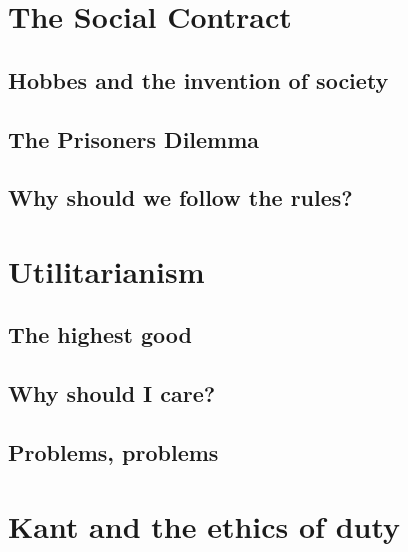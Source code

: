 \documentclass[justified]{tufte-book}
\begin{document}
\hypertarget{the-social-contract}{%
\chapter{The Social Contract}\label{the-social-contract}}

\hypertarget{hobbes-and-the-invention-of-society}{%
\section{Hobbes and the invention of society}\label{hobbes-and-the-invention-of-society}}

\hypertarget{the-prisoners-dilemma}{%
\section{The Prisoners Dilemma}\label{the-prisoners-dilemma}}

\hypertarget{why-should-we-follow-the-rules}{%
\section{Why should we follow the rules?}\label{why-should-we-follow-the-rules}}

\hypertarget{utilitarianism}{%
\chapter{Utilitarianism}\label{utilitarianism}}

\hypertarget{the-highest-good}{%
\section{The highest good}\label{the-highest-good}}

\hypertarget{why-should-i-care}{%
\section{Why should I care?}\label{why-should-i-care}}

\hypertarget{problems-problems}{%
\section{Problems, problems}\label{problems-problems}}

\hypertarget{kant-and-the-ethics-of-duty}{%
\chapter{Kant and the ethics of duty}\label{kant-and-the-ethics-of-duty}}
\end{document}
